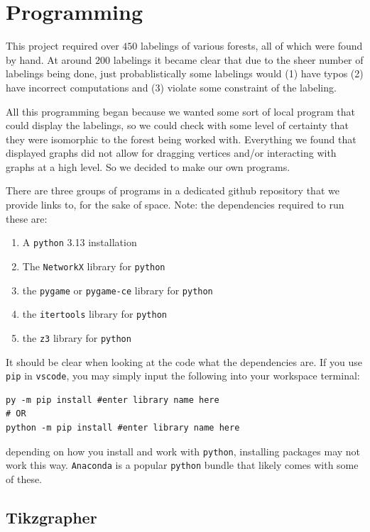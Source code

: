 \chapter{Programming}\label{chap:programming}
This project required over $450$ labelings of various forests, all of which were found by hand. At around $200$ labelings it became clear that due to the sheer number of labelings being done, just probablistically some labelings would (1) have typos (2) have incorrect computations and (3) violate some constraint of the labeling.

All this programming began because we wanted some sort of local program that could display the labelings, so we could check with some level of certainty that they were isomorphic to the forest being worked with. Everything we found that displayed graphs did not allow for dragging vertices and/or interacting with graphs at a high level. So we decided to make our own programs.

There are three groups of programs in a dedicated github repository that we provide links to, for the sake of space. Note: the dependencies required to run these are:

\begin{enumerate}
  \item A \verb|python| 3.13 installation
  \item The \verb|NetworkX| library for \verb|python|
  \item the \verb|pygame| or \verb|pygame-ce| library for \verb|python|
  \item the \verb|itertools| library for \verb|python|
  \item the \verb|z3| library for \verb|python|
\end{enumerate}
It should be clear when looking at the code what the dependencies are. If you use \verb|pip| in \verb|vscode|, you may simply input the following into your workspace terminal: 
\begin{verbatim}
py -m pip install #enter library name here
# OR
python -m pip install #enter library name here
\end{verbatim}
depending on how you install and work with \verb|python|, installing packages may not work this way. \verb|Anaconda| is a popular \verb|python| bundle that likely comes with some of these.

\section{Tikzgrapher}

